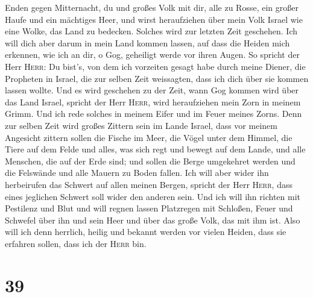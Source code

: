 Enden gegen Mitternacht, du und großes Volk mit dir, alle zu Rosse, ein
großer Haufe und ein mächtiges Heer,  und wirst
heraufziehen über mein Volk Israel wie eine Wolke, das Land zu bedecken.
Solches wird zur letzten Zeit geschehen. Ich will dich aber darum in
mein Land kommen lassen, auf dass die Heiden mich erkennen, wie ich an
dir, o Gog, geheiligt werde vor ihren Augen.  So spricht
der Herr \textsc{Herr}: Du bist's, von dem ich vorzeiten gesagt habe
durch meine Diener, die Propheten in Israel, die zur selben Zeit
weissagten, dass ich dich über sie kommen lassen wollte. 
Und es wird geschehen zu der Zeit, wann Gog kommen wird über das Land
Israel, spricht der Herr \textsc{Herr}, wird heraufziehen mein Zorn in
meinem Grimm.  Und ich rede solches in meinem Eifer und
im Feuer meines Zorns. Denn zur selben Zeit wird großes Zittern sein im
Lande Israel,  dass vor meinem Angesicht zittern sollen
die Fische im Meer, die Vögel unter dem Himmel, die Tiere auf dem Felde
und alles, was sich regt und bewegt auf dem Lande, und alle Menschen,
die auf der Erde sind; und sollen die Berge umgekehret werden und die
Felswände und alle Mauern zu Boden fallen.  Ich will aber
wider ihn herbeirufen das Schwert auf allen meinen Bergen, spricht der
Herr \textsc{Herr}, dass eines jeglichen Schwert soll wider den anderen
sein.  Und ich will ihn richten mit Pestilenz und Blut
und will regnen lassen Platzregen mit Schloßen, Feuer und Schwefel über
ihn und sein Heer und über das große Volk, das mit ihm ist.
 Also will ich denn herrlich, heilig und bekannt werden
vor vielen Heiden, dass sie erfahren sollen, dass ich der \textsc{Herr}
bin.

\hypertarget{section-38}{%
\section{39}\label{section-38}}

